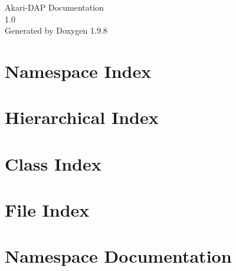 \documentclass[twoside]{book}
\newcommand{\+}{\discretionary{\mbox{\scriptsize$\hookleftarrow$}}{}{}}
\newcommand{\clearemptydoublepage}{%
    \newpage{\pagestyle{empty}\cleardoublepage}%
  }
\begin{document}
  \raggedbottom
    \hypersetup{pageanchor=false,
                bookmarksnumbered=true,
                pdfencoding=unicode
               }
  \begin{titlepage}
  \vspace*{7cm}
  \begin{center}%
  {\Large Akari-\/\+DAP Documentation}\\
  [1ex]\large 1.\+0 \\
  \vspace*{1cm}
  {\large Generated by Doxygen 1.9.8}\\
  \end{center}
  \end{titlepage}
  \clearemptydoublepage
  \tableofcontents
  \clearemptydoublepage
  \hypersetup{pageanchor=true}

\chapter{Namespace Index}

\chapter{Hierarchical Index}

\chapter{Class Index}

\chapter{File Index}

\chapter{Namespace Documentation}




\end{document}
